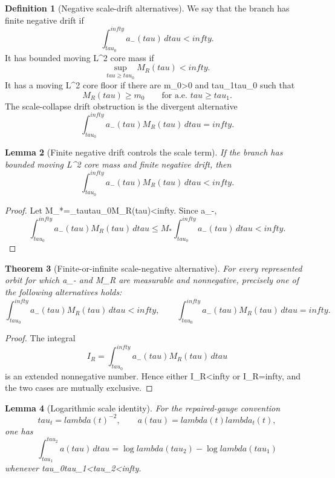 \documentclass[11pt]{amsart}
\def\({}%
\def\){}%
\def\tau{tau}%
\def\lambda{lambda}%
\def\infty{infty}%
\theoremstyle{plain}
\newtheorem{theorem}{Theorem}[section]
\newtheorem{lemma}[theorem]{Lemma}
\theoremstyle{definition}
\newtheorem{definition}[theorem]{Definition}
\theoremstyle{remark}
\begin{document}
\begin{definition}[Negative scale-drift alternatives]\label{paper6a:def:negative-drift}
We say that the branch has finite negative drift if
\[
  \int_{\tau_0}^{\infty}a_-(\tau)\,d\tau<\infty.
\]
It has bounded moving \(L^2\) core mass if
\[
  \sup_{\tau\ge\tau_0}M_R(\tau)<\infty.
\]
It has a moving \(L^2\) core floor if there are \(m_0>0\) and
\(\tau_1\ge\tau_0\) such that
\[
  M_R(\tau)\ge m_0
  \qquad\text{for a.e. }\tau\ge\tau_1.
\]
The scale-collapse drift obstruction is the divergent alternative
\[
  \int_{\tau_0}^{\infty}a_-(\tau)M_R(\tau)\,d\tau=\infty .
\]
\end{definition}

\begin{lemma}[Finite negative drift controls the scale term]
\label{paper6a:lem:finite-negative-drift}
If the branch has bounded moving \(L^2\) core mass and finite negative drift,
then
\[
  \int_{\tau_0}^{\infty}a_-(\tau)M_R(\tau)\,d\tau<\infty .
\]
\end{lemma}

\begin{proof}
Let \(M_*=\sup_{\tau\ge\tau_0}M_R(\tau)<\infty\).  Since \(a_-\),
\[
  \int_{\tau_0}^{\infty}a_-(\tau)M_R(\tau)\,d\tau
  \le
  M_*\int_{\tau_0}^{\infty}a_-(\tau)\,d\tau<\infty.
\]
\end{proof}

\begin{theorem}[Finite-or-infinite scale-negative alternative]
\label{paper6a:thm:finite-infinite-scale-negative}
For every represented orbit for which \(a_-\) and \(M_R\) are measurable and
nonnegative, precisely one of the following alternatives holds:
\[
  \int_{\tau_0}^{\infty}a_-(\tau)M_R(\tau)\,d\tau<\infty,
  \qquad
  \int_{\tau_0}^{\infty}a_-(\tau)M_R(\tau)\,d\tau=\infty.
\]
\end{theorem}

\begin{proof}
The integral
\[
  I_R=\int_{\tau_0}^{\infty}a_-(\tau)M_R(\tau)\,d\tau
\]
is an extended nonnegative number.  Hence either \(I_R<\infty\) or
\(I_R=\infty\), and the two cases are mutually exclusive.
\end{proof}

\begin{lemma}[Logarithmic scale identity]\label{paper6a:lem:log-scale}
For the repaired-gauge convention
\[
  \tau_t=\lambda(t)^{-2},\qquad a(\tau)=\lambda(t)\lambda_t(t),
\]
one has
\[
  \int_{\tau_1}^{\tau_2}a(\tau)\,d\tau
  =
  \log\lambda(\tau_2)-\log\lambda(\tau_1)
\]
whenever \(\tau_0\le\tau_1<\tau_2<\infty\).
\end{lemma}
\end{document}
